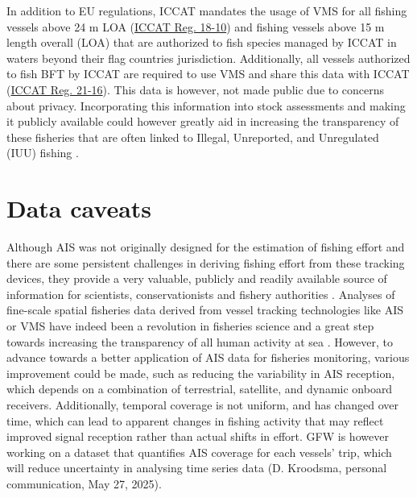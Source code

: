 \medskip

In addition to EU regulations, ICCAT mandates the usage of VMS for all fishing vessels above 24 m
LOA (\href{https://www.iccat.int/Documents/Recs/compendiopdf-e/2018-10-e.pdf}{ICCAT Reg. 18-10})
and fishing vessels above 15 m length overall (LOA) that are authorized to fish species managed by
ICCAT in waters beyond their flag countries jurisdiction. Additionally, all vessels authorized to
fish BFT by ICCAT are required to use VMS and share this data with ICCAT
(\href{https://www.iccat.int/Documents/Recs/compendiopdf-e/2021-16-e.pdf}{ICCAT Reg. 21-16}). This
data is however, not made public due to concerns about privacy. Incorporating this information into
stock assessments and making it publicly available could however greatly aid in increasing the
transparency of these fisheries that are often linked to Illegal, Unreported, and Unregulated (IUU)
fishing \citep{iuu_med,iccat_scrs_2008}.

\section{Data caveats}
Although AIS was not originally designed for the estimation of fishing effort and there are some
persistent challenges in deriving fishing effort from these tracking devices, they provide a very
valuable, publicly and readily available source of information for scientists, conservationists and
fishery authorities \citep{taconet2019global}. Analyses of fine-scale spatial fisheries data
derived from vessel tracking technologies like AIS or VMS have indeed been a revolution in
fisheries science and a great step towards increasing the transparency of all human activity at sea
\citep{russo_revolution,russo_revolution2}. However, to advance towards a better application of AIS
data for fisheries monitoring, various improvement could be made, such as reducing the variability
in AIS reception, which depends on a combination of terrestrial, satellite, and dynamic onboard
receivers. Additionally, temporal coverage is not uniform, and has changed over time, which can
lead to apparent changes in fishing activity that may reflect improved signal reception rather than
actual shifts in effort. GFW is however working on a dataset that quantifies AIS coverage for each
vessels' trip, which will reduce uncertainty in analysing time series data (D. Kroodsma, personal
communication, May 27, 2025).

\medskip

